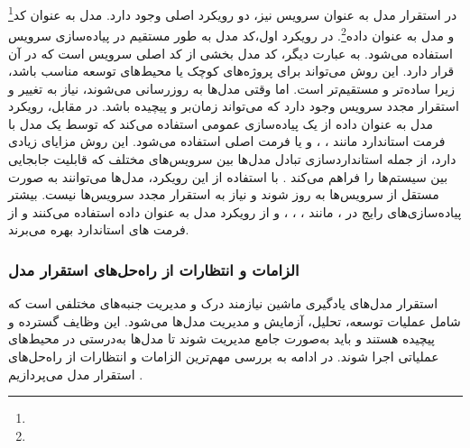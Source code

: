 در استقرار مدل به عنوان سرویس نیز، دو رویکرد اصلی وجود دارد. مدل به عنوان کد\footnote{} و مدل به عنوان داده\footnote{}. در رویکرد اول،‌کد مدل به طور مستقیم در پیاده‌سازی سرویس استفاده می‌شود. به عبارت دیگر، کد مدل بخشی از کد اصلی سرویس است که در آن قرار دارد. این روش می‌تواند برای پروژه‌های کوچک یا محیط‌های توسعه مناسب باشد، زیرا ساده‌تر و مستقیم‌تر است. اما وقتی مدل‌ها به روزرسانی می‌شوند، نیاز به تغییر و استقرار مجدد سرویس وجود دارد که می‌تواند زمان‌بر و پیچیده باشد. در مقابل، رویکرد مدل به عنوان داده از یک پیاده‌سازی عمومی استفاده می‌کند که توسط یک مدل با فرمت استاندارد مانند ، ،  و یا فرمت اصلی  استفاده می‌شود. این روش مزایای زیادی دارد، از جمله استانداردسازی تبادل مدل‌ها بین سرویس‌های مختلف که قابلیت جابجایی بین سیستم‌ها را فراهم می‌کند \cite{kubeflowforML}. با استفاده از این رویکرد، مدل‌ها می‌توانند به صورت مستقل از سرویس‌ها به روز شوند و نیاز به استقرار مجدد سرویس‌ها نیست. بیشتر پیاده‌سازی‌های رایج در ، مانند ، ، ، و  از رویکرد مدل به عنوان داده استفاده می‌کنند و از فرمت های استاندارد بهره می‌برند. 

\subsubsection{الزامات و انتظارات از راه‌حل‌های استقرار مدل}

استقرار مدل‌های یادگیری ماشین نیازمند درک و مدیریت جنبه‌های مختلفی است که شامل عملیات توسعه، تحلیل، آزمایش و مدیریت مدل‌ها می‌شود. این وظایف گسترده و پیچیده هستند و باید به‌صورت جامع مدیریت شوند تا مدل‌ها به‌درستی در محیط‌های عملیاتی اجرا شوند. در ادامه به بررسی مهم‌ترین الزامات و انتظارات از راه‌حل‌های استقرار مدل می‌پردازیم \cite{kubeflowforML}.

